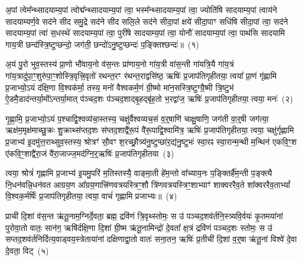 \setcounter{anuvakam}{0}
अ॒पां त्वेम᳚न्थ्सादयाम्य॒पां त्वोद्म᳚न्थ्सादयाम्य॒पां त्वा॒ भस्म᳚न्थ्सादयाम्य॒पां त्वा॒ ज्योति॑षि सादयाम्य॒पां त्वाय॑ने सादयाम्यर्ण॒वे सद॑ने सीद समु॒द्रे सद॑ने सीद सलि॒ले सद॑ने सीदा॒पां क्षये॑ सीदा॒पाꣳ सधि॑षि सीदा॒पां त्वा॒ सद॑ने सादयाम्य॒पां त्वा॑ स॒धस्थे॑ सादयाम्य॒पां त्वा॒ पुरी॑षे सादयाम्य॒पां त्वा॒ योनौ॑ सादयाम्य॒पां त्वा॒ पाथ॑सि सादयामि गाय॒त्री छन्द॑स्त्रि॒ष्टुप्छन्दो॒ जग॑ती॒ छन्दो॑\-ऽनु॒ष्टुप्छन्दः॑ प॒ङ्क्तिश्छन्दः॑॥~(१)

{\anuvakamend[{योनौ॒ पञ्च॑दश च}]}%

अ॒यं पु॒रो भुव॒स्तस्य॑ प्रा॒णो भौ॑वाय॒नो व॑स॒न्तः प्रा॑णाय॒नो गा॑य॒त्री वा॑स॒न्ती गा॑यत्रि॒यै गा॑य॒त्रं गा॑य॒त्रादु॑पा॒ꣳ॒शु\-रु॑पा॒ꣳ॒शोस्त्रि॒वृत्त्रि॒वृतो॑ रथन्त॒रꣳ र॑थन्त॒राद्वसि॑ष्ठ॒ ऋषिः॑ प्र॒जा\-प॑तिगृहीतया॒ त्वया᳚ प्रा॒णं गृ॑ह्णामि प्र॒जाभ्यो॒\-ऽयं द॑क्षि॒णा वि॒श्वक॑र्मा॒ तस्य॒ मनो॑ वैश्वकर्म॒णं ग्री॒ष्मो मा॑न॒सस्त्रि॒ष्टुग्ग्रै॒ष्मी त्रि॒ष्टुभ॑ ऐ॒डमै॒डाद॑न्तर्या॒मो᳚\-ऽन्तर्या॒मात् प॑ञ्चद॒शः प॑ञ्चद॒शाद्बृ॒हद्बृ॑ह॒तो भ॒रद्वा॑ज॒ ऋषिः॑ प्र॒जा\-प॑तिगृहीतया॒ त्वया॒ मनः॑~(२)

गृ॒ह्णा॒मि॒ प्र॒जाभ्यो॒\-ऽयं प॒श्चाद्वि॒श्वव्य॑चा॒स्तस्य॒ चक्षु॑र्वैश्वव्यच॒सं व॒र्॒\mbox{}षाणि॑ चाक्षु॒षाणि॒ जग॑ती वा॒र्॒\mbox{}षी जग॑त्या॒ ऋक्ष॑म॒मृक्ष॑माच्छु॒क्रः शु॒क्राथ्स॑प्तद॒शः स॑प्तद॒शाद्वै॑रू॒पं वै॑रू॒पाद्वि॒श्वामि॑त्र॒ ऋषिः॑ प्र॒जा\-प॑तिगृहीतया॒ त्वया॒ चक्षु॑र्गृह्णामि प्र॒जाभ्य॑ इ॒दमु॑त्त॒राथ्सुव॒स्तस्य॒ श्रोत्रꣳ॑ सौ॒वꣳ श॒रच्छ्रौ॒त्र्य॑नु॒ष्टुप्छा॑र॒द्य॑नु॒ष्टुभः॑ स्वा॒रꣴ स्वा॒रान्म॒न्थी म॒न्थिन॑ एकवि॒ꣳ॒श ए॑कवि॒ꣳ॒शाद्वै॑रा॒जं वै॑रा॒जाज्ज॒मद॑ग्नि॒र्॒\mbox{}ऋषिः॑ प्र॒जा\-प॑तिगृहीतया~(३)

त्वया॒ श्रोत्रं॑ गृह्णामि प्र॒जाभ्य॑ इ॒यमु॒परि॑ म॒तिस्तस्यै॒ वाङ्मा॒ती हे॑म॒न्तो वा᳚च्याय॒नः प॒ङ्क्तिर्\mbox{}है॑म॒न्ती प॒ङ्क्त्यै नि॒धन॑वन्नि॒धन॑वत आग्रय॒ण आ᳚ग्रय॒णात्त्रि॑णवत्रयस्त्रिꣳ॒शौ त्रि॑णवत्रयस्त्रिꣳ॒शाभ्याꣳ॑ शाक्वररैव॒ते शा᳚क्वररैव॒ता\-भ्यां᳚ वि॒श्वक॒र्मर्\mbox{}षिः॑ प्र॒जा\-प॑तिगृहीतया॒ त्वया॒ वाचं॑ गृह्णामि प्रजाभ्यः॥~(४)

{\anuvakamend[{त्वया॒ मनो॑ ज॒मद॑ग्नि॒र्॒\mbox{}ऋषिः॑ प्र॒जा\-प॑तिगृहीतया त्रि॒ꣳ॒शच्च॑}]}%

प्राची॑ दि॒शां व॑स॒न्त ऋ॑तू॒नाम॒ग्निर्दे॒वता॒ ब्रह्म॒ द्रवि॑णं त्रि॒वृथ्स्तोमः॒ स उ॑ पञ्चद॒शव॑र्तनि॒स्त्र्यवि॒र्वयः॑ कृ॒तमया॑नां पुरोवा॒तो वातः॒ सान॑ग॒ ऋषि॑र्दक्षि॒णा दि॒शां ग्री॒ष्म ऋ॑तू॒नामिन्द्रो॑ दे॒वता᳚ क्ष॒त्रं द्रवि॑णं पञ्चद॒शः स्तोमः॒ स उ॑ सप्तद॒शव॑र्तनिर्दित्य॒वाड्वय॒स्त्रेताया॑नां दक्षिणाद्वा॒तो वातः॑ सना॒तन॒ ऋषिः॑ प्र॒तीची॑ दि॒शां व॒र्॒\mbox{}षा ऋ॑तू॒नां विश्वे॑ दे॒वा दे॒वता॒ विट्~(५)

